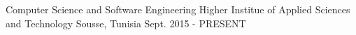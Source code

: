 \begin{cventries}
  \cventry
    {Computer Science and Software Engineering}
    {Higher Institue of Applied Sciences and Technology}
    {Sousse, Tunisia}
    {Sept. 2015 - PRESENT}
    {
    }
\end{cventries}
